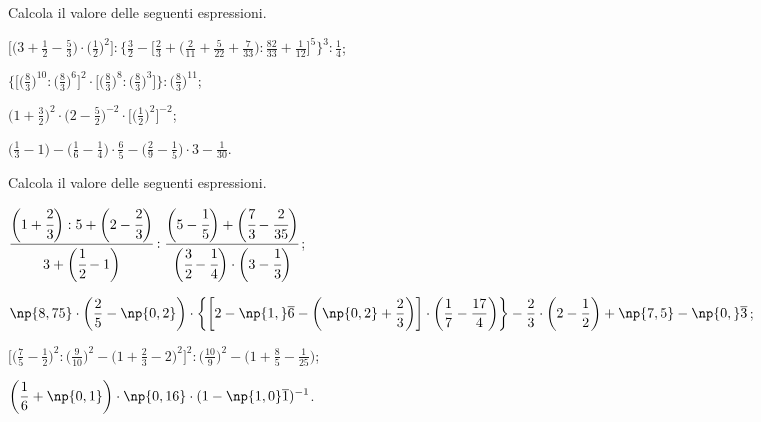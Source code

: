 \begin{esercizio}[\Ast]
 Calcola il valore delle seguenti espressioni.
\begin{enumeratea}
\spazielenx
\item $\displaystyle{\bigg[\bigg(3+\frac{1}{2}-\frac{5}{3}\bigg)\cdot
\bigg(\frac{1}{2}\bigg)^{2}\bigg]:\bigg\{\frac{3}{2}-\bigg[\frac{2}{3}+\bigg(\frac{2}{11}+
\frac{5}{22}+\frac{7}{33}\bigg):\frac{82}{33}+\frac{1}{12}\bigg]^{5}\bigg\}^{3}:\frac{1}{4}}$;
\item $\displaystyle{\bigg\{\bigg[\bigg(\frac{8}{3}\bigg)^{10}:\bigg(\frac{8}{3}\bigg)^{6}\bigg]^{2}\cdot
\bigg[\bigg(\frac{8}{3}\bigg)^{8}:\bigg(\frac{8}{3}\bigg)^{3}\bigg]\bigg\}:\bigg(\frac{8}{3}\bigg)^{11}}$;
\item $\displaystyle{\bigg(1+\frac{3}{2}\bigg)^{2}\cdot
\bigg(2-\frac{5}{2}\bigg)^{-2}\cdot
\bigg[\bigg(\frac{1}{2}\bigg)^{2}\bigg]^{-2}}$;
\item $\displaystyle{\bigg(\frac{1}{3}-1\bigg)-\bigg(\frac{1}{6}-\frac{1}{4}\bigg)\cdot
{\frac{6}{5}}-\bigg(\frac{2}{9}-\frac{1}{5}\bigg)\cdot 3-\frac{1}{30}}$.
\end{enumeratea}
\end{esercizio}

\begin{esercizio}[\Ast]
 Calcola il valore delle seguenti espressioni.
\begin{enumeratea}
\spazielenx
\item $\displaystyle{\cfrac{\bigg(1+\cfrac{2}{3}\bigg):5+\bigg(2-\cfrac{2}{3}\bigg)}{3+\bigg(\cfrac{1}{2}-1\bigg)}:
\frac{\bigg(5-\cfrac{1}{5}\bigg)+\bigg(\cfrac{7}{3}-\cfrac{2}{35}\bigg)}{\bigg(\cfrac{3}{2}-\cfrac{1}{4}\bigg)\cdot
\bigg(3-\cfrac{1}{3}\bigg)}}$;
\item $\displaystyle{\np{8,75}\cdot\bigg(\frac{2}{5}-\np{0,2}\bigg)\cdot\bigg\{\bigg[2-\np{1,}\overline{{6}}-\bigg(\np{0,2}+\frac{2}{3}\bigg)\bigg]
\cdot\bigg(\frac{1}{7}-\frac{17}{4}\bigg)\bigg\}-\frac{2}{3}\cdot\bigg(2-\frac{1}{2}\bigg)+\np{7,5}-\np{0,}\overline{{3}}}$;
\item $\displaystyle{\bigg[\bigg(\frac{7}{5}-\frac{1}{2}\bigg)^{2}:\bigg(\frac{9}{10}\bigg)^{2}-
\bigg(1+\frac{2}{3}-2\bigg)^{2}\bigg]^{2}:\bigg(\frac{10}{9}\bigg)^{2}-\bigg(1+\frac{8}{5}-\frac{1}{25}\bigg)}$;
\item $\displaystyle{\bigg(\frac{1}{6}+\np{0,1}\bigg)\cdot \np{0,16}\cdot
(1-\np{1,0}\overline{{1}})^{-1}}$.
\end{enumeratea}
\end{esercizio}

